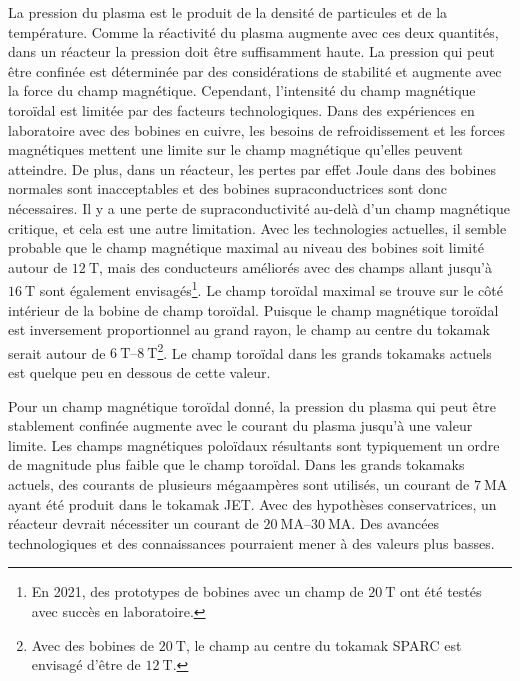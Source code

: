 \documentclass[main.tex]{subfiles}
\begin{document}
La pression du plasma est le produit de la densité de particules et de la température.
Comme la réactivité du plasma augmente avec ces deux quantités, dans un réacteur la pression doit être suffisamment haute.
La pression qui peut être confinée est déterminée par des considérations de stabilité et augmente avec la force du champ magnétique.
Cependant, l'intensité du champ magnétique toroïdal est limitée par des facteurs technologiques.
Dans des expériences en laboratoire avec des bobines en cuivre, les besoins de refroidissement et les forces magnétiques mettent une limite sur le champ magnétique qu'elles peuvent atteindre.
De plus, dans un réacteur, les pertes par effet Joule dans des bobines normales sont inacceptables et des bobines supraconductrices sont donc nécessaires.
Il y a une perte de supraconductivité au-delà d'un champ magnétique critique, et cela est une autre limitation.
Avec les technologies actuelles, il semble probable que le champ magnétique maximal au niveau des bobines soit limité autour de \( \SI{12}{\tesla} \), mais des conducteurs améliorés avec des champs allant jusqu'à \( \SI{16}{\tesla} \) sont également envisagés\footnote{En 2021, des prototypes de bobines avec un champ de \( \SI{20}{\tesla} \) ont été testés avec succès en laboratoire.}.
Le champ toroïdal maximal se trouve sur le côté intérieur de la bobine de champ toroïdal.
Puisque le champ magnétique toroïdal est inversement proportionnel au grand rayon, le champ au centre du tokamak serait autour de \( \qtyrange[range-units=single,range-phrase=-]{6}{8}{\tesla} \)\footnote{Avec des bobines de \( \SI{20}{\tesla} \), le champ au centre du tokamak SPARC est envisagé d'être de \( \SI{12}{\tesla} \).}.
Le champ toroïdal dans les grands tokamaks actuels est quelque peu en dessous de cette valeur.

Pour un champ magnétique toroïdal donné, la pression du plasma qui peut être stablement confinée augmente avec le courant du plasma jusqu'à une valeur limite.
Les champs magnétiques poloïdaux résultants sont typiquement un ordre de magnitude plus faible que le champ toroïdal.
Dans les grands tokamaks actuels, des courants de plusieurs mégaampères sont utilisés, un courant de \( \SI{7}{\mega\ampere} \) ayant été produit dans le tokamak JET.
Avec des hypothèses conservatrices, un réacteur devrait nécessiter un courant de \( \qtyrange[range-units=single,range-phrase=-]{20}{30}{\mega\ampere} \).
Des avancées technologiques et des connaissances pourraient mener à des valeurs plus basses.
\end{document}
